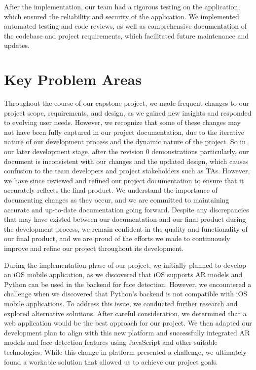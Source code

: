 \documentclass{article}
\begin{document}
After the implementation, our team had a rigorous testing on the application, which ensured the reliability and security of the application. We implemented automated testing and code reviews, as well as comprehensive documentation of the codebase and project requirements, which facilitated future maintenance and updates.

\section{Key Problem Areas}

Throughout the course of our capstone project, we made frequent changes to our project scope, requirements, and design, as we gained new insights and responded to evolving user needs. However, we recognize that some of these changes may not have been fully captured in our project documentation, due to the iterative nature of our development process and the dynamic nature of the project. So in our later development stage, after the revision 0 demonstrations particularly, our document is inconsistent with our changes and the updated design, which causes confusion to the team developers and project stakeholders such as TAs. However, we have since reviewed and refined our project documentation to ensure that it accurately reflects the final product. We understand the importance of documenting changes as they occur, and we are committed to maintaining accurate and up-to-date documentation going forward. Despite any discrepancies that may have existed between our documentation and our final product during the development process, we remain confident in the quality and functionality of our final product, and we are proud of the efforts we made to continuously improve and refine our project throughout its development.

During the implementation phase of our project, we initially planned to develop an iOS mobile application, as we discovered that iOS supports AR models and Python can be used in the backend for face detection. However, we encountered a challenge when we discovered that Python's backend is not compatible with iOS mobile applications. To address this issue, we conducted further research and explored alternative solutions. After careful consideration, we determined that a web application would be the best approach for our project. We then adapted our development plan to align with this new platform and successfully integrated AR models and face detection features using JavaScript and other suitable technologies. While this change in platform presented a challenge, we ultimately found a workable solution that allowed us to achieve our project goals.
\end{document}
